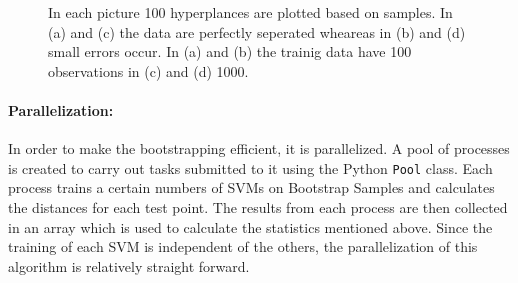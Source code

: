 \documentclass[a4paper]{article}
\begin{document}
\begin{figure}[!htb]
\begin{center}

\caption{In each picture 100 hyperplances are plotted based on samples. In (a) and (c) the data are perfectly seperated wheareas in (b) and (d) small errors occur. In (a) and (b) the trainig data have 100 observations in (c) and (d) 1000.}
\label{fig2}
\end{center}
\end{figure}

\paragraph{Parallelization:} In order to make the bootstrapping efficient, it is parallelized. A pool of processes is created to carry out tasks submitted to it using the Python \texttt{Pool} class. Each process trains a certain numbers of SVMs on Bootstrap Samples and calculates the distances for each test point. The results from each process are then collected in an array which is used to calculate the statistics mentioned above. Since the training of each SVM is independent of the others, the parallelization of this algorithm is relatively straight forward.
\end{document}

